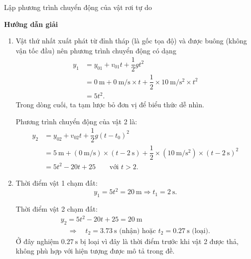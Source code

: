 \begin{dang}{Lập phương trình chuyển động của vật rơi tự do}
	{	\begin{center}
			\textbf{Hướng dẫn giải}
		\end{center}
		
		\begin{enumerate}[label=\alph*.]
			\item 
			Vật thứ nhất xuất phát từ đỉnh tháp (là gốc tọa độ) và được buông (không vận tốc đầu) nên phương trình chuyển động có dạng 
			\begin{align*}
				y_1&=y_{01}+v_{01}t+\dfrac{1}{2}gt^2\\
				&=\SI{0}{\meter}+ \SI{0}{\meter/\second}\times t +\dfrac{1}{2}\times\SI{10}{\meter/\second^{2}}\times t^{2}\\
				&=5t^{2}.
			\end{align*}
			Trong dòng cuối, ta tạm lược bỏ đơn vị để biểu thức dễ nhìn. 
			
			Phương trình chuyển động của vật 2 là:
			\begin{align*}
				y_{2}&=y_{02}+v_{02}t+\dfrac{1}{2}g(t-t_0)^2\\
				&=\SI{5}{\meter}+(\SI{0}{\meter/\second})\times (t-\SI{2}{\second})+\dfrac{1}{2}\times(\SI{10}{\meter/\second^{2}})\times (t-\SI{2}{\second})^{2}\\
				&=5t^2-20t+25\qquad \textrm{với }t>2.
			\end{align*}
			\item 
			Thời điểm vật 1 chạm đất:
			\begin{equation*}
				y_1=5t^2=\SI{20}{\meter}\Rightarrow t_1=\SI{2}{\second}.
			\end{equation*}
			
			Thời điểm vật 2 chạm đất:
			\begin{equation*}
				\begin{gathered}
					y_{2}=5t^2-20t+25=\SI{20}{\meter}\\ \quad\Rightarrow\quad t_2=\SI{3.73}{\second}\textrm{ (nhận) hoặc } t_2=\SI{0.27}{\second}\textrm{ (loại)}.
				\end{gathered}
			\end{equation*}
			Ở đây nghiệm $\SI{0.27}{\second}$ bị loại vì đây là thời điểm trước khi vật 2 được thả, không phù hợp với hiện tượng được mô tả trong đề. 
			

\end{enumerate}}
\end{dang}
